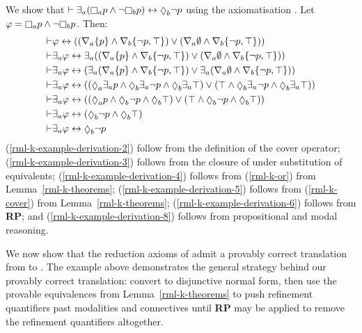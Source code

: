 \begin{example}
We show that $\proves \somerefsA (\necessaryA \atomP \land \lnot \necessaryB \atomP) \iff \possibleB \lnot \atomP$ using the axiomatisation \axiomRmlK{}.
Let $\phi = \necessaryA \atomP \land \lnot \necessaryB \atomP$.
Then:
\begin{align}
    \proves & \phi \iff ((\coversA \{\atomP\} \land \coversB \{\lnot \atomP, \top\}) \lor (\coversA \emptyset \land \coversB \{\lnot \atomP, \top\})) \label{rml-k-example-derivation-2}\\
    \proves & \somerefsA \phi \iff \somerefsA ((\coversA \{\atomP\} \land \coversB \{\lnot \atomP, \top\}) \lor (\coversA \emptyset \land \coversB \{\lnot \atomP, \top\})) \label{rml-k-example-derivation-3}\\
    \proves & \somerefsA \phi \iff (\somerefsA (\coversA \{\atomP\} \land \coversB \{\lnot \atomP, \top\}) \lor \somerefsA (\coversA \emptyset \land \coversB \{\lnot \atomP, \top\})) \label{rml-k-example-derivation-4}\\
    \proves & \somerefsA \phi \iff ((\possibleA \somerefsA \atomP \land \possibleB \somerefsA \lnot \atomP \land \possibleB \somerefsA \top) \lor (\top \land \possibleB \somerefsA \lnot \atomP \land \possibleB \somerefsA \top)) \label{rml-k-example-derivation-5}\\
    \proves & \somerefsA \phi \iff ((\possibleA \atomP \land \possibleB \lnot \atomP \land \possibleB \top) \lor (\top \land \possibleB \lnot \atomP \land \possibleB \top)) \label{rml-k-example-derivation-6}\\
    \proves & \somerefsA \phi \iff (\possibleB \lnot \atomP \land \possibleB \top) \label{rml-k-example-derivation-7}\\
    \proves & \somerefsA \phi \iff \possibleB \lnot \atomP \label{rml-k-example-derivation-8}
\end{align}
(\ref{rml-k-example-derivation-2}) follow from the definition of the cover operator;
(\ref{rml-k-example-derivation-3}) follows from the closure of \axiomRmlK{} under substitution of equivalents;
(\ref{rml-k-example-derivation-4}) follows from (\ref{rml-k-or}) from Lemma~\ref{rml-k-theorems};
(\ref{rml-k-example-derivation-5}) follows from (\ref{rml-k-cover}) from Lemma~\ref{rml-k-theorems};
(\ref{rml-k-example-derivation-6}) follows from {\bf RP};
and (\ref{rml-k-example-derivation-8}) follows from propositional and modal reasoning.
\end{example}

We now show that the reduction axioms of \logicRmlK{} admit a provably correct translation from \langRml{} to \langMl{}.
The example above demonstrates the general strategy behind our provably correct translation: convert to disjunctive normal form, then use the provable equivalences from Lemma~\ref{rml-k-theorems} to push refinement quantifiers past modalities and connectives until {\bf RP} may be applied to remove the refinement quantifiers altogether.

